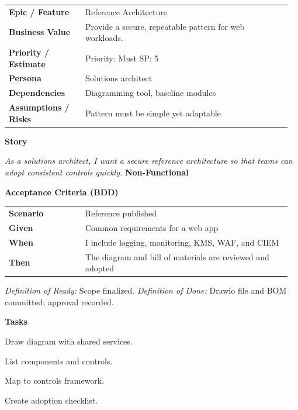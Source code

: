 \documentclass[11pt,letterpaper]{article}
\makeatletter
\newenvironment{kvtable}{%
  \begin{tabular}{@{}>{\bfseries\arraybackslash}p{0.26\linewidth} p{0.70\linewidth}@{}}
}{\end{tabular}}
\newenvironment{bdd}{%
  \begin{tabular}{@{}>{\bfseries\arraybackslash}p{0.26\linewidth} p{0.70\linewidth}@{}}
}{\end{tabular}}
\newcommand{\DoRDoD}[2]{%
  \vspace{0.35em}
  {\footnotesize\color{Muted}%
    \textit{Definition of Ready:} #1 \; \textbullet\;
    \textit{Definition of Done:} #2%
  }%
}
\newenvironment{storycard}[2]{%
  \begin{tcolorbox}[cloudcard, title={#1 --- #2}]%
}{\end{tcolorbox}}
\newcommand{\sectionlabel}[1]{\vspace{0.35em}\textbf{#1}\par}
\makeatother
\begin{document}
\begin{storycard}{CCS-14}{Ch. 14 — Security Essentials \& Reference Architectures}
\begin{kvtable}
Epic / Feature & Reference Architecture\\
Business Value & Provide a secure, repeatable pattern for web workloads.\\
Priority / Estimate & Priority: Must \quad SP: 5\\
Persona & Solutions architect\\
Dependencies & Diagramming tool, baseline modules\\
Assumptions / Risks & Pattern must be simple yet adaptable\\
\end{kvtable}
\sectionlabel{Story}
\textit{As a solutions architect, I want a secure reference architecture so that teams can adopt consistent controls quickly.}
\sectionlabel{Non-Functional}\;
\sectionlabel{Acceptance Criteria (BDD)}
\begin{bdd}
Scenario & Reference published\\
Given & Common requirements for a web app\\
When & I include logging, monitoring, KMS, WAF, and CIEM\\
Then & The diagram and bill of materials are reviewed and adopted\\
\end{bdd}
\DoRDoD{Scope finalized.}{Drawio file and BOM committed; approval recorded.}
\sectionlabel{Tasks}
\begin{checklist}
\item Draw diagram with shared services.
\item List components and controls.
\item Map to controls framework.
\item Create adoption checklist.
\end{checklist}
\end{storycard}
\end{document}
